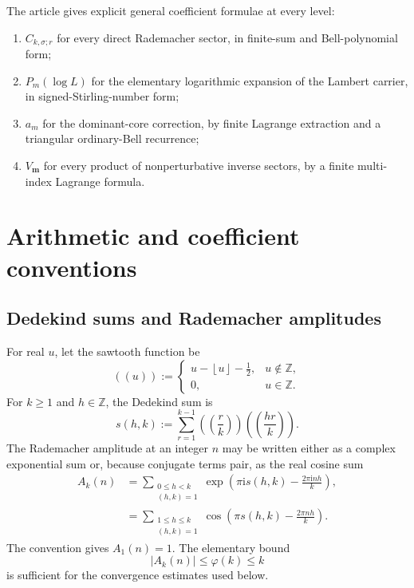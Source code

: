 \documentclass[11pt,a4paper]{article}
\numberwithin{equation}{section}
\theoremstyle{definition}
\theoremstyle{remark}
\newcommand{\ii}{\mathrm i}
\newcommand{\Z}{\mathbb Z}
\newcommand{\multi}[1]{\boldsymbol{#1}}
\newcommand{\abs}[1]{\lvert#1\rvert}
\newcommand{\floor}[1]{\left\lfloor#1\right\rfloor}
\begin{document}
\begin{resultbox}
The article gives explicit general coefficient formulae at every level:
\begin{enumerate}[label=\arabic*.]
\item $C_{k,\sigma;r}$ for every direct Rademacher sector, in finite-sum and
      Bell-polynomial form;
\item $P_m(\log L)$ for the elementary logarithmic expansion of the Lambert
      carrier, in signed-Stirling-number form;
\item $a_m$ for the dominant-core correction, by finite Lagrange extraction and
      a triangular ordinary-Bell recurrence;
\item $V_{\multi m}$ for every product of nonperturbative inverse sectors, by a
      finite multi-index Lagrange formula.
\end{enumerate}
\end{resultbox}

\section{Arithmetic and coefficient conventions}

\subsection{Dedekind sums and Rademacher amplitudes}

For real $u$, let the sawtooth function be
\begin{equation}\label{eq:sawtooth}
 ((u)):=
 \begin{cases}
 u-\floor{u}-\frac12,&u\notin\Z,\\
 0,&u\in\Z.
 \end{cases}
\end{equation}
For $k\geq1$ and $h\in\Z$, the Dedekind sum is
\begin{equation}\label{eq:dedekind}
 s(h,k):=\sum_{r=1}^{k-1}
 \left(\left(\frac rk\right)\right)
 \left(\left(\frac{hr}{k}\right)\right).
\end{equation}
The Rademacher amplitude at an integer $n$ may be written either as a complex
exponential sum or, because conjugate terms pair, as the real cosine sum
\begin{align}
 A_k(n)
 &=\sum_{\substack{0\leq h<k\\(h,k)=1}}
 \exp\!\left(\pi\ii s(h,k)-\frac{2\pi\ii nh}{k}\right),
 \label{eq:A-complex}\\
 &=\sum_{\substack{1\leq h\leq k\\(h,k)=1}}
 \cos\!\left(\pi s(h,k)-\frac{2\pi nh}{k}\right).
 \label{eq:A-cos}
\end{align}
The convention gives $A_1(n)=1$.  The elementary bound
\begin{equation}\label{eq:A-trivial-bound}
 \abs{A_k(n)}\leq \varphi(k)\leq k
\end{equation}
is sufficient for the convergence estimates used below.
\end{document}
